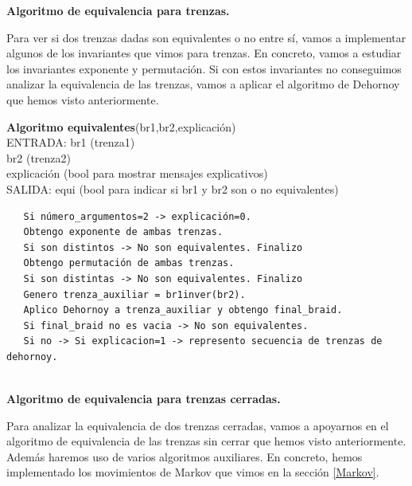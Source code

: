 \bigskip
\begin{center}
	\textbf{Algoritmo de equivalencia para trenzas.}
\end{center} 
Para ver si dos trenzas dadas son equivalentes o no entre sí, vamos a implementar algunos de los invariantes que vimos para trenzas. En concreto, vamos a estudiar los invariantes exponente y permutación. Si con estos invariantes no conseguimos analizar la equivalencia de las trenzas, vamos a aplicar el algoritmo de Dehornoy que hemos visto anteriormente. \\

\begin{alg}
	\textbf{Algoritmo equivalentes}(br1,br2,explicación)\\
	ENTRADA: br1 (trenza1)\\
	\hspace*{2.2cm} br2 (trenza2)\\
	\hspace*{2.2cm} explicación (bool para mostrar mensajes explicativos)\\
	SALIDA: \hspace{0.4cm} equi (bool para indicar si br1 y br2 son o no equivalentes)
	
\begin{lstlisting}
   Si número_argumentos=2 -> explicación=0.
   Obtengo exponente de ambas trenzas.
   Si son distintos -> No son equivalentes. Finalizo
   Obtengo permutación de ambas trenzas.
   Si son distintas -> No son equivalentes. Finalizo
   Genero trenza_auxiliar = br1inver(br2).
   Aplico Dehornoy a trenza_auxiliar y obtengo final_braid.
   Si final_braid no es vacia -> No son equivalentes. 
   Si no -> Si explicacion=1 -> represento secuencia de trenzas de dehornoy.
    
\end{lstlisting}
\end{alg}

\bigskip
\begin{center}
	\textbf{Algoritmo de equivalencia para trenzas cerradas.}
\end{center} 
Para analizar la equivalencia de dos trenzas cerradas, vamos a apoyarnos en el algoritmo de equivalencia de las trenzas sin cerrar que hemos visto anteriormente. Además haremos uso de varios algoritmos auxiliares. En concreto, hemos implementado los movimientos de Markov que vimos en la sección \ref{Markov}.\\

